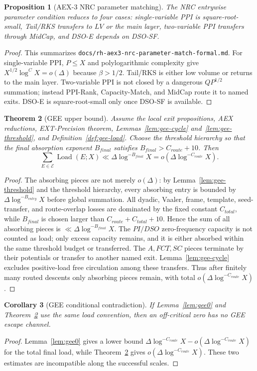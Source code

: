 \documentclass[11pt]{article}
\newtheorem{theorem}{Theorem}[section]
\newtheorem{proposition}[theorem]{Proposition}
\newtheorem{corollary}[theorem]{Corollary}
\theoremstyle{definition}
\begin{document}
\begin{proposition}[AEX-3 NRC parameter matching]
The NRC entrywise parameter condition reduces to four cases: single-variable PPI is square-root-small, Tail/RKS transfers to $LV$ or the main layer, two-variable PPI transfers through MidCap, and DSO-E depends on DSO-SF.
\end{proposition}
\begin{proof}
This summarizes \texttt{docs/rh-aex3-nrc-parameter-match-formal.md}.  For single-variable PPI, $P\le X$ and polylogarithmic complexity give $X^{1/2}\log^C X=o(\Delta)$ because $\beta>1/2$.  Tail/RKS is either low volume or returns to the main layer.  Two-variable PPI is not closed by a dangerous $Q P^{1/2}$ summation; instead PPI-Rank, Capacity-Match, and MidCap route it to named exits.  DSO-E is square-root-small only once DSO-SF is available.
\end{proof}

\begin{theorem}[GEE upper bound]\label{thm:gee-upper}
Assume the local exit propositions, AEX reductions, EXT-Precision theorem, Lemmas~\ref{lem:gee-cycle} and~\ref{lem:gee-threshold}, and Definition~\ref{def:gee-load}.  Choose the threshold hierarchy so that the final absorption exponent $B_{final}$ satisfies $B_{final}>C_{route}+10$.  Then
\[
  \sum_{E\in\mathcal E}\operatorname{Load}(E;X)
    \ll \Delta\log^{-B_{final}}X
    =o(\Delta\log^{-C_{route}}X).
\]
\end{theorem}
\begin{proof}
The absorbing pieces are not merely $o(\Delta)$: by Lemma~\ref{lem:gee-threshold} and the threshold hierarchy, every absorbing entry is bounded by $\Delta\log^{-B_{entry}}X$ before global summation.  All dyadic, Vaaler, frame, template, seed-transfer, and route-overlap losses are dominated by the fixed constant $C_{total}$, while $B_{final}$ is chosen larger than $C_{route}+C_{total}+10$.  Hence the sum of all absorbing pieces is $\ll\Delta\log^{-B_{final}}X$.  The $PI/DSO$ zero-frequency capacity is not counted as load; only excess capacity remains, and it is either absorbed within the same threshold budget or transferred.  The $A,FCT,SC$ pieces terminate by their potentials or transfer to another named exit.  Lemma~\ref{lem:gee-cycle} excludes positive-load free circulation among these transfers.  Thus after finitely many routed descents only absorbing pieces remain, with total $o(\Delta\log^{-C_{route}}X)$.
\end{proof}

\begin{corollary}[GEE conditional contradiction]\label{cor:gee-contradiction}
If Lemma~\ref{lem:gee0} and Theorem~\ref{thm:gee-upper} use the same load convention, then an off-critical zero has no GEE escape channel.
\end{corollary}
\begin{proof}
Lemma~\ref{lem:gee0} gives a lower bound $\Delta\log^{-C_{route}}X-o(\Delta\log^{-C_{route}}X)$ for the total final load, while Theorem~\ref{thm:gee-upper} gives $o(\Delta\log^{-C_{route}}X)$.  These two estimates are incompatible along the successful scales.
\end{proof}
\end{document}
